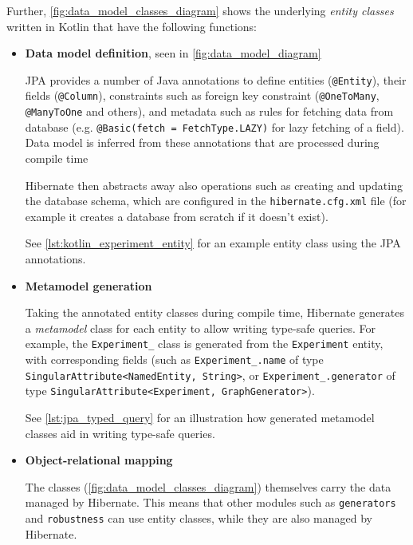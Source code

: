 Further, \autoref{fig:data_model_classes_diagram} shows the underlying \textsl{entity classes} written in Kotlin that have the following functions:
\begin{itemize}[topsep=5pt,label=$\boldsymbol{\rightarrow}$]
    \item \textbf{Data model definition}, seen in \autoref{fig:data_model_diagram}

    JPA provides a number of Java annotations to define entities (\texttt{@Entity}), their fields (\texttt{@Column}), constraints such as foreign key constraint (\texttt{@OneToMany}, \texttt{@ManyToOne} and others), and metadata such as rules for fetching data from database (e.g. \texttt{@Basic(fetch = FetchType.LAZY)} for lazy fetching of a field).
    Data model is inferred from these annotations that are processed during compile time

    Hibernate then abstracts away also operations such as creating and updating the database schema, which are configured in the \texttt{hibernate.cfg.xml} file (for example it creates a database from scratch if it doesn't exist).

    See \autoref{lst:kotlin_experiment_entity} for an example entity class using the JPA annotations.

    \item \textbf{Metamodel generation}

    Taking the annotated entity classes during compile time, Hibernate generates a \textsl{metamodel} class for each entity to allow writing type-safe queries.
    For example, the \texttt{Experiment\_} class is generated from the \texttt{Experiment} entity, with corresponding fields (such as \texttt{Experiment\_.name} of type \texttt{SingularAttribute<NamedEntity, String>}, or \texttt{Experiment\_.generator} of type \texttt{SingularAttribute<Experiment, GraphGenerator>}).

    See \autoref{lst:jpa_typed_query} for an illustration how generated metamodel classes aid in writing type-safe queries.

    

    \item \textbf{Object-relational mapping}

    The classes (\autoref{fig:data_model_classes_diagram}) themselves carry the data managed by Hibernate.
    This means that other modules such as \texttt{generators} and \texttt{robustness} can use entity classes, while they are also managed by Hibernate.


\end{itemize}
